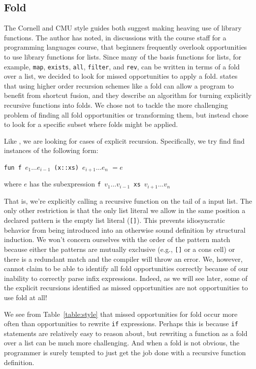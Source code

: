\documentclass[12pt,abstracton]{scrartcl}
\begin{document}
\subsection{Fold}\label{subsec:fold}
The Cornell and CMU style guides both suggest making heaving use of library functions.
The author has noted, in discussions with the course staff for a programming languages course,
that beginners frequently overlook opportunities to use library functions for lists. Since many of the basis functions
for lists, for example, \texttt{map}, \texttt{exists}, \texttt{all}, \texttt{filter},
and \texttt{rev}, can be written in terms of a fold over a list, we decided to look
for missed opportunities to apply a fold. \cite{Jeu13}
states that using higher order recursion schemes like a fold can allow a program
to benefit from shortcut fusion, and they
describe an algorithm for turning
explicitly recursive functions into folds. We chose not to tackle the more challenging
problem of finding all fold opportunities or transforming them,
but instead chose to look for a specific subset where folds might be applied.

Like \cite{Jeu13}, we are looking for cases of explicit recursion. Specifically, we try find
find instances of the following form:
\begin{center}
\texttt{fun f }\(e_{1}\ldots e_{i-1}\)\texttt{ (x::xs) }\(e_{i+1}\ldots e_{n}\) \(= e\)

where $e$ has the subexpression \texttt{f }\(v_{1}\ldots v_{i-1}\)\texttt{ xs }\(v_{i+1}\ldots v_{n}\)
\end{center}
That is, we're explicitly calling a recursive function on the tail of a input list.
The only other restriction is that the only list literal we allow in the same position
a declared pattern is the empty list literal (\texttt{[]}). This prevents idiosyncratic
behavior from being introduced into an otherwise sound definition by structural induction.
We won't concern ourselves with the order of the pattern match because either the patterns
are mutually exclusive (e.g., \texttt{[]} or a cons cell) or there is a redundant match
and the compiler will throw an error. We, however, cannot claim to be able to identify all
fold opportunities correctly because of our inability to correctly parse infix expressions.
Indeed, as we will see later, some of the explicit recursions identified as missed
opportunities are not opportunities to use fold at all!

We see from Table~\ref{table:style} that missed opportunities for fold occur more often
than opportunities to rewrite \texttt{if} expressions. Perhaps this is
because \texttt{if} statements are relatively easy to reason about, but
rewriting a function as a fold over a list can be much more challenging.
And when a fold is not obvious, the programmer is surely tempted to just
get the job done with a recursive function definition.
\end{document}
